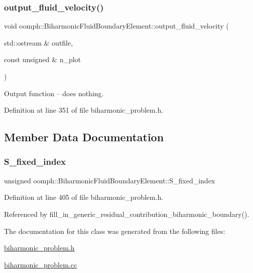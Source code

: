 \subsubsection{\texorpdfstring{output\+\_\+fluid\+\_\+velocity()}{output\_fluid\_velocity()}}
{\footnotesize\ttfamily void oomph\+::\+Biharmonic\+Fluid\+Boundary\+Element\+::output\+\_\+fluid\+\_\+velocity (\begin{DoxyParamCaption}\item[{std\+::ostream \&}]{outfile,  }\item[{const unsigned \&}]{n\+\_\+plot }\end{DoxyParamCaption})\hspace{0.3cm}{\ttfamily [inline]}}



Output function -- does nothing. 



Definition at line 351 of file biharmonic\+\_\+problem.\+h.



\subsection{Member Data Documentation}
\mbox{\label{classoomph_1_1BiharmonicFluidBoundaryElement_a4f72d42e59d5797067b69b31b9e440f5}} 
\subsubsection{\texorpdfstring{S\+\_\+fixed\+\_\+index}{S\_fixed\_index}}
{\footnotesize\ttfamily unsigned oomph\+::\+Biharmonic\+Fluid\+Boundary\+Element\+::\+S\+\_\+fixed\+\_\+index\hspace{0.3cm}{\ttfamily [private]}}



Definition at line 405 of file biharmonic\+\_\+problem.\+h.



Referenced by fill\+\_\+in\+\_\+generic\+\_\+residual\+\_\+contribution\+\_\+biharmonic\+\_\+boundary().



The documentation for this class was generated from the following files\+:\begin{DoxyCompactItemize}
\item 
\hyperlink{biharmonic__problem_8h}{biharmonic\+\_\+problem.\+h}\item 
\hyperlink{biharmonic__problem_8cc}{biharmonic\+\_\+problem.\+cc}\end{DoxyCompactItemize}
